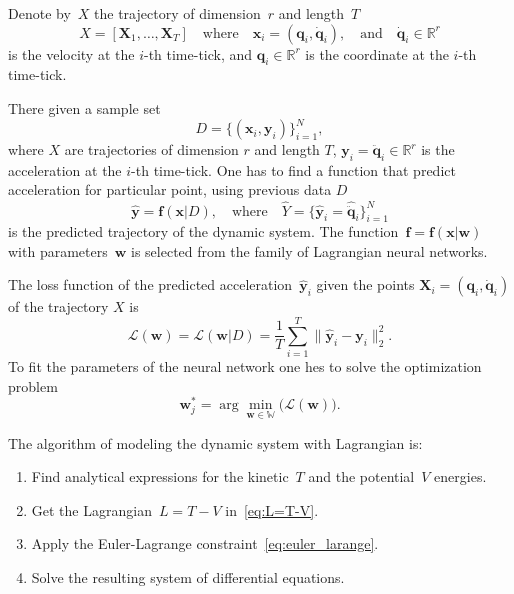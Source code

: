 \documentclass[sn-mathphys-num]{sn-jnl}
\theoremstyle{thmstylethree}
\theoremstyle{thmstyletwo}
\theoremstyle{thmstyleone}
\begin{document}
Denote by~$X$ the trajectory of dimension~$r$ and length~$T$ 
\begin{equation}
X = [\mathbf{X}_1,\dots, \mathbf{X}_T] \quad \text{where} \quad \mathbf{x}_i = (\mathbf{q}_i, \dot{\mathbf{q}}_i), \quad  \text{and}\quad \dot{\mathbf{q}}_i \in \mathbb{R}^r
\label{definition:trajectory}
\end{equation}
is the velocity at the $i$-th time-tick, and $\mathbf{q}_i \in \mathbb{R}^r$  is the coordinate at the $i$-th time-tick.

There given a sample set 
\begin{equation}
D = \{(\mathbf{x}_i, \mathbf{y}_i)\}_{i=1}^N,
\label{eq:dataset}
\end{equation}
where $X$ are trajectories of dimension $r$ and length $T$, $\mathbf{y}_i = \ddot{\mathbf{q}}_i \in \mathbb{R}^r$ is the acceleration at the $i$-th time-tick. One has to find a function that predict acceleration for particular point, using previous data $D$
\begin{equation}
\hat{\mathbf{y}}  = \mathbf{f}(\mathbf{x} | D),
\quad
\text{where}
\quad
\hat{Y} = \{\hat{\mathbf{y}}_i = \hat{\ddot{\mathbf{q}}}_i\}_{i=1}^N
\label{eq:model}
\end{equation}
is the predicted trajectory of the dynamic system. The function~$\mathbf{f}=\mathbf{f}(\mathbf{x} | \mathbf{w})$ with parameters~$\mathbf{w}$ is selected from the family  of Lagrangian neural networks.

The loss function of the predicted acceleration~$\hat{\mathbf{y}}_i$ given the points $\mathbf{X}_i = (\mathbf{q}_i, \dot{\mathbf{q}}_i)$ of the trajectory $X$ is 
\begin{equation}
 \mathcal{L}(\textbf{w}) = \mathcal{L}(\mathbf{w} | D) = \frac{1}{T}\sum_{i=1}^{T} \| \hat{\mathbf{y}}_i - \mathbf{y}_i \|_2^2.
\end{equation}
To fit the parameters of the neural network one hes to solve the optimization problem
\begin{equation} 
\label{eq:opt_task}
\textbf{w}_j^* = \arg\min_{\mathbf{w} \in \mathbb{W}} \bigl( \mathcal{L}(\textbf{w}) \bigr). 
\end{equation}

The algorithm of modeling the dynamic system with  Lagrangian is:
\begin{enumerate}
	\item Find analytical expressions for the kinetic~$T$ and the potential~$V$ energies.
	\item Get the Lagrangian~$L=T-V$ in~\eqref{eq:L=T-V}.
	\item Apply the Euler-Lagrange constraint~\eqref{eq:euler_larange}.
	\item Solve the resulting system of differential equations.
\end{enumerate}
\end{document}
